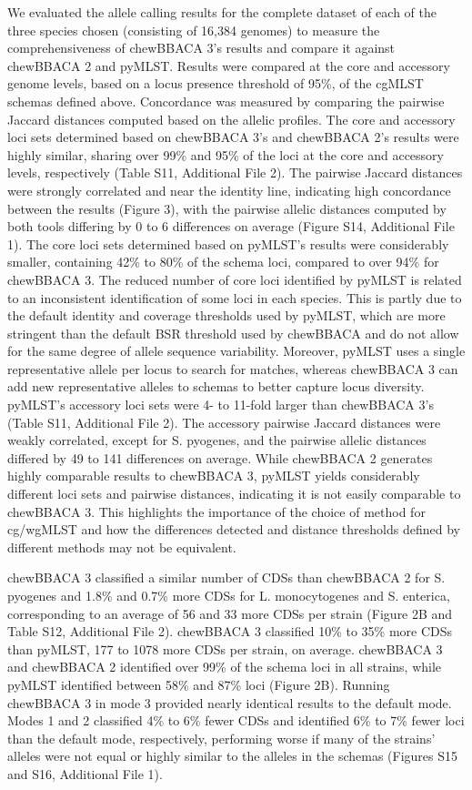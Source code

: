 We evaluated the allele calling results for the complete dataset of each of the three species chosen (consisting of 16,384 genomes) to measure the comprehensiveness of chewBBACA 3's results and compare it against chewBBACA 2 and pyMLST. Results were compared at the core and accessory genome levels, based on a locus presence threshold of 95\%, of the cgMLST schemas defined above. Concordance was measured by comparing the pairwise Jaccard distances computed based on the allelic profiles. The core and accessory loci sets determined based on chewBBACA 3’s and chewBBACA 2’s results were highly similar, sharing over 99\% and 95\% of the loci at the core and accessory levels, respectively (Table S11, Additional File 2). The pairwise Jaccard distances were strongly correlated and near the identity line, indicating high concordance between the results (Figure 3), with the pairwise allelic distances computed by both tools differing by 0 to 6 differences on average (Figure S14, Additional File 1). The core loci sets determined based on pyMLST’s results were considerably smaller, containing 42\% to 80\% of the schema loci, compared to over 94\% for chewBBACA 3. The reduced number of core loci identified by pyMLST is related to an inconsistent identification of some loci in each species. This is partly due to the default identity and coverage thresholds used by pyMLST, which are more stringent than the default BSR threshold used by chewBBACA and do not allow for the same degree of allele sequence variability. Moreover, pyMLST uses a single representative allele per locus to search for matches, whereas chewBBACA 3 can add new representative alleles to schemas to better capture locus diversity. pyMLST's accessory loci sets were 4- to 11-fold larger than chewBBACA 3's (Table S11, Additional File 2). The accessory pairwise Jaccard distances were weakly correlated, except for S. pyogenes, and the pairwise allelic distances differed by 49 to 141 differences on average. While chewBBACA 2 generates highly comparable results to chewBBACA 3, pyMLST yields considerably different loci sets and pairwise distances, indicating it is not easily comparable to chewBBACA 3. This highlights the importance of the choice of method for cg/wgMLST and how the differences detected and distance thresholds defined by different methods may not be equivalent.

chewBBACA 3 classified a similar number of CDSs than chewBBACA 2 for S. pyogenes and 1.8\% and 0.7\% more CDSs for L. monocytogenes and S. enterica, corresponding to an average of 56 and 33 more CDSs per strain (Figure 2B and Table S12, Additional File 2). chewBBACA 3 classified 10\% to 35\% more CDSs than pyMLST, 177 to 1078 more CDSs per strain, on average. chewBBACA 3 and chewBBACA 2 identified over 99\% of the schema loci in all strains, while pyMLST identified between 58\% and 87\% loci (Figure 2B). Running chewBBACA 3 in mode 3 provided nearly identical results to the default mode. Modes 1 and 2 classified 4\% to 6\% fewer CDSs and identified 6\% to 7\% fewer loci than the default mode, respectively, performing worse if many of the strains’ alleles were not equal or highly similar to the alleles in the schemas (Figures S15 and S16, Additional File 1).

